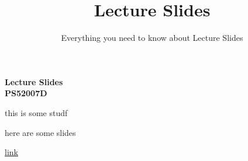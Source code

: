 \documentclass[12pt,
  a4paper,
  landscape]{article}
\title{\textbf{Lecture Slides}}
\subtitle{Everything you need to know about Lecture Slides}
\author{}
\date{}
\begin{document}
    \begin{center}
    \vspace*{5cm}
    {\Huge\bfseries Lecture Slides}\\
          \vfill
      {\large\bfseries PS52007D}
        \end{center}  
    \thispagestyle{empty}
        \newpage
  
\ifdefined\Shaded\renewenvironment{Shaded}{\begin{tcolorbox}[breakable, sharp corners, borderline west={3pt}{0pt}{shadecolor}, boxrule=0pt, enhanced, interior hidden, frame hidden]}{\end{tcolorbox}}\fi





this is some studf

here are some slides

\href{https://researchmethods.littlemonkeylab.com/slides/LectureSlides.html}{link}
\end{document}
